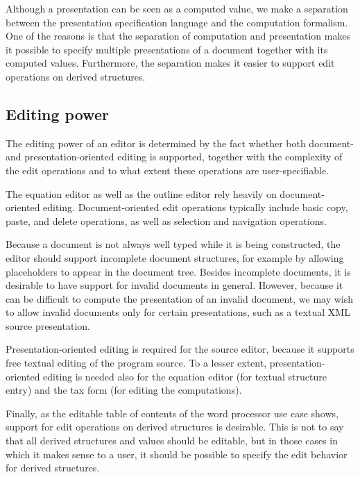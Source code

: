 \documentclass{speauth}
\begin{document}
Although a presentation can be seen as a computed value, we make a separation between the presentation specification language and the computation formalism. One of the reasons is that the separation of computation and presentation makes it possible to specify multiple presentations of a document together with its computed values. Furthermore, the separation makes it easier to support edit operations on derived structures.


%																
\subsection{Editing power} \label{sect:editingPower}

The editing power of an editor is determined by the fact whether both document- and presentation-oriented editing is supported, together with the complexity of the edit operations and to what extent these operations are user-specifiable. 



The equation editor as well as the outline editor rely heavily on document-oriented editing. Document-oriented edit operations typically include basic copy, paste, and delete operations, as well as selection and navigation operations.

Because a document is not always well typed while it is being constructed, the editor should support incomplete document structures, for example by allowing placeholders to appear in the document tree. Besides incomplete documents, it is desirable to have support for invalid documents in general. However, because it can be difficult to compute the presentation of an invalid document, we may wish to allow invalid documents only for certain presentations, such as a textual XML source presentation. 

Presentation-oriented editing is required for the source editor, because it supports free textual editing of the program source. To a lesser extent, presentation-oriented editing is needed also for the equation editor (for textual structure entry) and the tax form (for editing the computations). 

Finally, as the editable table of contents of the word processor use case shows, support for edit operations on derived structures is desirable. This is not to say that all derived structures and values should be editable, but in those cases in which it makes sense to a user, it should be possible to specify the edit behavior for derived structures.
\end{document}
